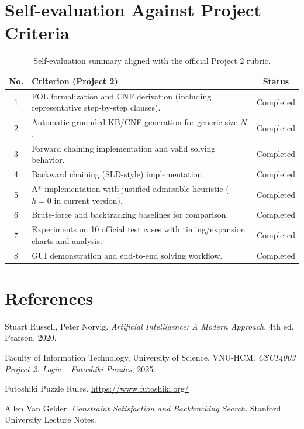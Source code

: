 \documentclass[12pt,a4paper]{article}
\begin{document}
\section{Self-evaluation Against Project Criteria}

\begin{table}[H]
\centering
\renewcommand{\arraystretch}{1.25}
\begin{tabularx}{\textwidth}{|c|X|c|}
\hline
\textbf{No.} & \textbf{Criterion (Project 2)} & \textbf{Status} \\
\hline
1 & FOL formalization and CNF derivation (including representative step-by-step clauses). & Completed \\
\hline
2 & Automatic grounded KB/CNF generation for generic size $N$. & Completed \\
\hline
3 & Forward chaining implementation and valid solving behavior. & Completed \\
\hline
4 & Backward chaining (SLD-style) implementation. & Completed \\
\hline
5 & A* implementation with justified admissible heuristic ($h=0$ in current version). & Completed \\
\hline
6 & Brute-force and backtracking baselines for comparison. & Completed \\
\hline
7 & Experiments on 10 official test cases with timing/expansion charts and analysis. & Completed \\
\hline
8 & GUI demonstration and end-to-end solving workflow. & Completed \\
\hline
\end{tabularx}
\caption{Self-evaluation summary aligned with the official Project 2 rubric.}
\end{table}

\section*{References}

\begin{enumerate}[label={[\arabic*]}]
    \item Stuart Russell, Peter Norvig. \textit{Artificial Intelligence: A Modern Approach}, 4th ed. Pearson, 2020.
    \item Faculty of Information Technology, University of Science, VNU-HCM. \textit{CSC14003 Project 2: Logic -- Futoshiki Puzzles}, 2025.
    \item Futoshiki Puzzle Rules. \url{https://www.futoshiki.org/}
    \item Allen Van Gelder. \textit{Constraint Satisfaction and Backtracking Search}. Stanford University Lecture Notes.
\end{enumerate}
\end{document}
